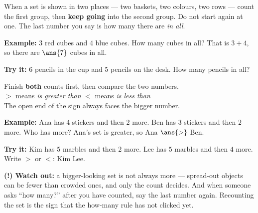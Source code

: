 \documentclass[12pt]{article}
\begin{document}
\begin{formulabox}
When a set is shown in two places --- two baskets, two colours, two rows ---
count the first group, then \textbf{keep going} into the second group. Do not
start again at one. The last number you say is how many there are \emph{in
all}.
\end{formulabox}

\begin{examplebox}
\textbf{Example:} $3$ red cubes and $4$ blue cubes. How many cubes in all?
That is $3 + 4$, so there are $\ans{7}$ cubes in all.
\end{examplebox}

\begin{tryitbox}
\textbf{Try it:} $6$ pencils in the cup and $5$ pencils on the desk. How many
pencils in all?\\[2pt]
\end{tryitbox}


\begin{formulabox}
Finish \textbf{both} counts first, then compare the two numbers.\\[2pt]
$>$ means \emph{is greater than} \qquad $<$ means \emph{is less than}\\[2pt]
The open end of the sign always faces the bigger number.
\end{formulabox}

\begin{examplebox}
\textbf{Example:} Ana has $4$ stickers and then $2$ more. Ben has $3$ stickers
and then $2$ more. Who has more?
Ana's set is greater, so Ana $\ans{>}$ Ben.
\end{examplebox}

\begin{tryitbox}
\textbf{Try it:} Kim has $5$ marbles and then $2$ more. Lee has $5$ marbles and
then $4$ more. Write $>$ or $<$: \; Kim \underline{\hspace{0.9cm}} Lee.\\[2pt]
\end{tryitbox}

\begin{watchoutbox}
\textbf{(!) Watch out:} a bigger-looking set is not always more --- spread-out
objects can be fewer than crowded ones, and only the count decides. And when
someone asks ``how many?'' after you have counted, say the last number again.
Recounting the set is the sign that the how-many rule has not clicked yet.
\end{watchoutbox}
\end{document}
